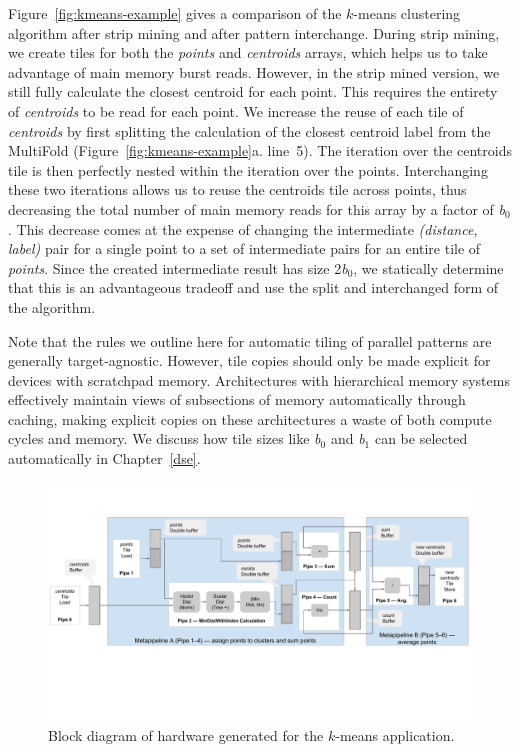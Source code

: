 Figure~\ref{fig:kmeans-example} gives a comparison of the $k$-means clustering
algorithm after strip mining and after pattern interchange. During strip mining,
we create tiles for both the \emph{points} and \emph{centroids} arrays, which
helps us to take advantage of main memory burst reads. However, in the strip
mined version, we still fully calculate the closest centroid for each point.
This requires the entirety of \emph{centroids} to be read for each point.
We increase the reuse of each tile of \emph{centroids} by first splitting
the calculation of the closest centroid label from the MultiFold
(Figure~\ref{fig:kmeans-example}a. line~5). The iteration over the centroids
tile is then perfectly nested within the iteration over the points.
Interchanging these two iterations allows us to reuse the centroids tile across
points, thus decreasing the total number of main memory reads for this array
by a factor of \emph{b$_0$}. This decrease comes
at the expense of changing the intermediate \emph{(distance, label)} pair for a single
point to a set of intermediate pairs for an entire tile of \emph{points}.
Since the created intermediate result
has size 2\emph{b$_0$}, we statically determine that this is an advantageous
tradeoff and use the split and interchanged form of the algorithm.

Note that the rules we outline here for automatic tiling of parallel patterns are
generally target-agnostic. However, tile copies should only be made explicit for devices
with scratchpad memory. Architectures with hierarchical memory systems
effectively maintain views of subsections of memory automatically through
caching, making explicit copies on these architectures a waste of both
compute cycles and memory. We discuss how tile sizes like \emph{b$_0$} and
\emph{b$_1$} can be selected automatically in Chapter~\ref{dse}.

\begin{figure}
\centering
\includegraphics[width=6in]{3-delite/figs/kmeans-blockdiagram.pdf}
\caption{Block diagram of hardware generated for the $k$-means application.}
\label{fig:metapipelining}
\end{figure}

